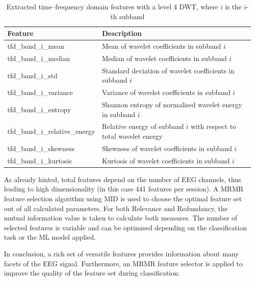     \begin{table}[h!]
      \centering
      \begin{tabular}{|p{}|p{}|}
        \hline
        \textbf{Feature} & \textbf{Description} \\
        \hline
        tfd\_band\_i\_mean & Mean of wavelet coefficients in subband $i$ \\
        \hline
        tfd\_band\_i\_median & Median of wavelet coefficients in subband $i$ \\
        \hline
        tfd\_band\_i\_std & Standard deviation of wavelet coefficients in subband $i$ \\
        \hline
        tfd\_band\_i\_variance & Variance of wavelet coefficients in subband $i$ \\
        \hline
        tfd\_band\_i\_entropy & Shannon entropy of normalised wavelet energy in subband $i$ \\
        \hline
        tfd\_band\_i\_relative\_energy & Relative energy of subband $i$ with respect to total wavelet energy \\
        \hline
        tfd\_band\_i\_skewness & Skewness of wavelet coefficients in subband $i$ \\
        \hline
        tfd\_band\_i\_kurtosis & Kurtosis of wavelet coefficients in subband $i$ \\
        \hline
      \end{tabular}
      \caption{Extracted time–frequency domain features with a level 4 \ac{DWT}, where $i$ is the $i$-th subband}
      \label{tab:time_frequency_domain_features}
    \end{table}
    As already hinted, total features depend on the number of \ac{EEG} channels, thus leading to high dimensionality (in this case 441 features per session). A \ac{MRMR} feature selection algorithm using MID is used to choose the optimal feature set out of all calculated parameters. For both Relevance and Redundancy, the mutual information value is taken to calculate both measures. The number of selected features is variable and can be optimised depending on the classification task or the \ac{ML} model applied. \par
    In conclusion, a rich set of versatile features provides information about many facets of the \ac{EEG} signal. Furthermore, an \ac{MRMR} feature selector is applied to improve the quality of the feature set during classification.

 

